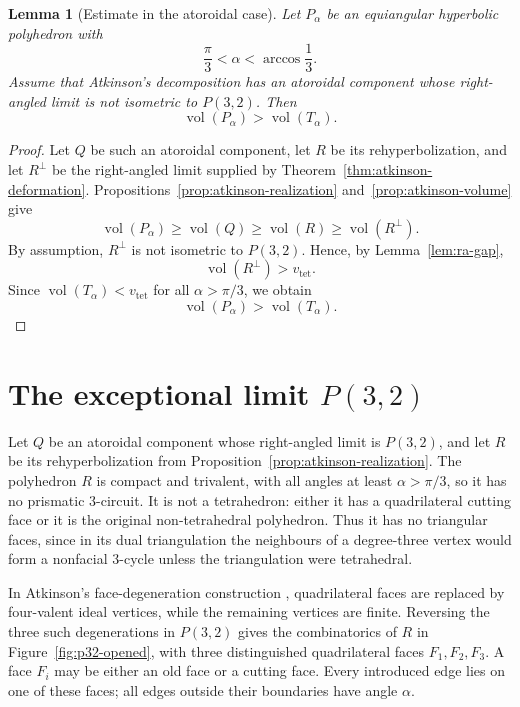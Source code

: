 \documentclass[12pt,a4paper]{article}
\newtheorem{lemma}[theorem]{Lemma}
\theoremstyle{definition}
\DeclareMathOperator{\Vol}{vol}
\newcommand{\vtet}{v_{\mathrm{tet}}}
\begin{document}
\begin{lemma}[Estimate in the atoroidal case]\label{lem:atoroidal-general}
Let \(P_\alpha\) be an equiangular hyperbolic polyhedron with
\[
        \frac{\pi}{3}<\alpha<\arccos\frac13 .
\]
Assume that Atkinson's decomposition has an atoroidal component whose right-angled limit is not isometric to \(P(3,2)\). Then
\[
        \Vol(P_\alpha)>\Vol(T_\alpha).
\]
\end{lemma}

\begin{proof}
Let \(Q\) be such an atoroidal component, let \(R\) be its
rehyperbolization, and let \(R^\perp\) be the right-angled limit supplied by
Theorem~\ref{thm:atkinson-deformation}.  Propositions~\ref{prop:atkinson-realization}
and~\ref{prop:atkinson-volume} give
\[
        \Vol(P_\alpha)\ge \Vol(Q)\ge \Vol(R)\ge \Vol(R^\perp).
\]
By assumption, \(R^\perp\) is not isometric to \(P(3,2)\). Hence, by Lemma~\ref{lem:ra-gap},
\[
        \Vol(R^\perp)>\vtet.
\]
Since \(\Vol(T_\alpha)<\vtet\) for all \(\alpha>\pi/3\), we obtain
\[
        \Vol(P_\alpha)>\Vol(T_\alpha).
\]
\end{proof}

\section{The exceptional limit \texorpdfstring{\(P(3,2)\)}{P(3,2)}}

Let \(Q\) be an atoroidal component whose right-angled limit is \(P(3,2)\),
and let \(R\) be its rehyperbolization from
Proposition~\ref{prop:atkinson-realization}. The polyhedron \(R\) is compact
and trivalent, with all angles at least \(\alpha>\pi/3\), so it has no
prismatic \(3\)-circuit. It is not a tetrahedron: either it has a
quadrilateral cutting face or it is the original non-tetrahedral polyhedron.
Thus it has no triangular faces, since in its dual triangulation the
neighbours of a degree-three vertex would form a nonfacial \(3\)-cycle
unless the triangulation were tetrahedral.

In Atkinson's face-degeneration construction
\cite[Sections~5 and~8]{Atkinson2011}, quadrilateral faces are replaced by
four-valent ideal vertices, while the remaining vertices are finite.
Reversing the three such degenerations in \(P(3,2)\) gives the combinatorics
of \(R\) in Figure~\ref{fig:p32-opened}, with three distinguished
quadrilateral faces \(F_1,F_2,F_3\). A face \(F_i\) may be either an old
face or a cutting face. Every introduced edge lies on one of these faces;
all edges outside their boundaries have angle \(\alpha\).
\end{document}

